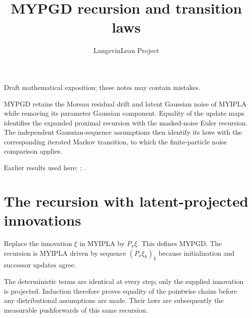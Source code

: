 \documentclass[11pt,a4paper]{article}
\title{\texorpdfstring{MYPGD recursion and transition laws}{MYPGD recursion and transition laws}}
\author{LangevinLean Project}
\date{}
\begin{document}
\maketitle
Draft mathematical exposition; these notes may contain mistakes.


MYPGD retains the Moreau residual drift and latent Gaussian noise of MYIPLA while removing its parameter Gaussian component. Equality of the update maps identifies the expanded proximal recursion with the masked-noise Euler recursion. The independent Gaussian-sequence assumptions then identify its laws with the corresponding iterated Markov transition, to which the finite-particle noise comparison applies.



Earlier results used here: \cite[Section~3.33]{LangevinLean2026ULASC}; \cite[Section~3.41]{LangevinLean2026ULASC}.

\section{\texorpdfstring{The recursion with latent-projected innovations}{The recursion with latent-projected innovations}}


Replace the innovation \(\xi\) in MYIPLA by \(P_x\xi\). This defines MYPGD. The recursion is MYIPLA driven by sequence \((P_x\xi_k)_k\) because initialization and successor updates agree.



The deterministic terms are identical at every step; only the supplied innovation is projected. Induction therefore proves equality of the pointwise chains before any distributional assumptions are made. Their laws are subsequently the measurable pushforwards of this same recursion.
\end{document}
